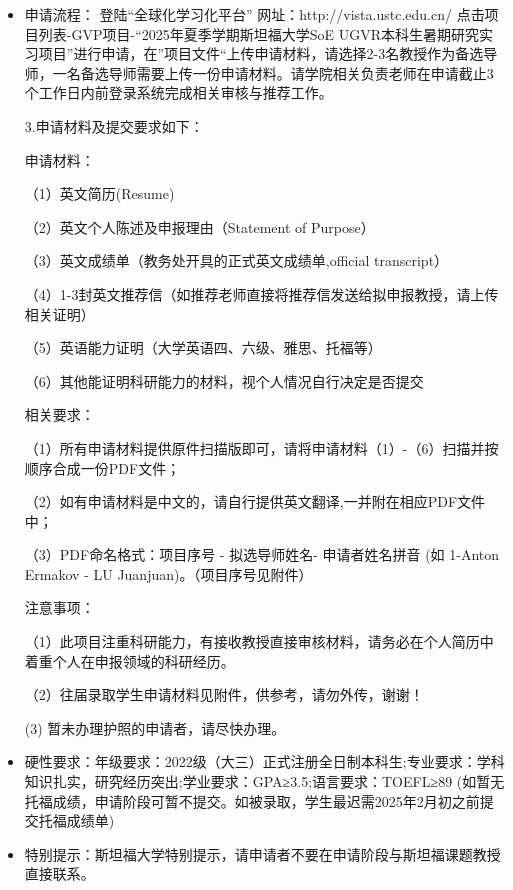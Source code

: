 \begin{presentbox}
    \begin{itemize}
        \item 申请流程：
        登陆“全球化学习化平台” 网址：http://vista.ustc.edu.cn/ 点击项目列表-GVP项目-“2025年夏季学期斯坦福大学SoE UGVR本科生暑期研究实习项目”进行申请，在”项目文件“上传申请材料，请选择2-3名教授作为备选导师，一名备选导师需要上传一份申请材料。请学院相关负责老师在申请截止3个工作日内前登录系统完成相关审核与推荐工作。

3.申请材料及提交要求如下：

申请材料：

（1）英文简历(Resume)

（2）英文个人陈述及申报理由（Statement of Purpose）

（3）英文成绩单（教务处开具的正式英文成绩单,official transcript）

（4）1-3封英文推荐信（如推荐老师直接将推荐信发送给拟申报教授，请上传相关证明）

（5）英语能力证明（大学英语四、六级、雅思、托福等）

（6）其他能证明科研能力的材料，视个人情况自行决定是否提交

相关要求：

（1）所有申请材料提供原件扫描版即可，请将申请材料（1）-（6）扫描并按顺序合成一份PDF文件；

（2）如有申请材料是中文的，请自行提供英文翻译,一并附在相应PDF文件中；

（3）PDF命名格式：项目序号 - 拟选导师姓名- 申请者姓名拼音 (如 1-Anton Ermakov - LU Juanjuan)。（项目序号见附件）

注意事项：

（1）此项目注重科研能力，有接收教授直接审核材料，请务必在个人简历中着重个人在申报领域的科研经历。

（2）往届录取学生申请材料见附件，供参考，请勿外传，谢谢！

(3) 暂未办理护照的申请者，请尽快办理。

        \item 硬性要求：年级要求：2022级（大三）正式注册全日制本科生;专业要求：学科知识扎实，研究经历突出;学业要求：GPA≥3.5;语言要求：TOEFL≥89 (如暂无托福成绩，申请阶段可暂不提交。如被录取，学生最迟需2025年2月初之前提交托福成绩单)

        \item 特别提示：斯坦福大学特别提示，请申请者不要在申请阶段与斯坦福课题教授直接联系。
    \end{itemize}
\end{presentbox}

